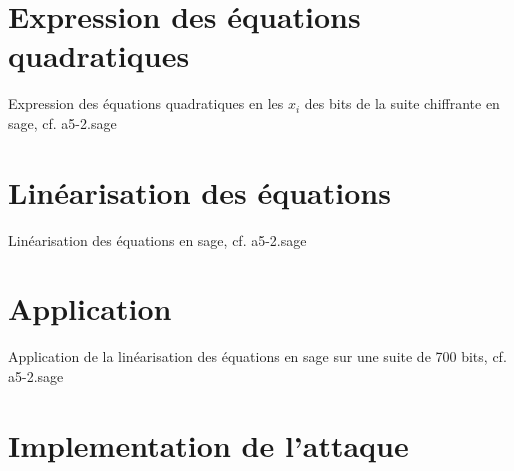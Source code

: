 \documentclass[a4paper]{article}
\begin{document}


\section{Expression des équations quadratiques}
Expression des équations quadratiques en les $x_i$ des bits de la suite chiffrante en sage, cf. a5-2.sage



\section{Linéarisation des équations}
Linéarisation des équations en sage, cf. a5-2.sage

\section{Application}
Application de la linéarisation des équations en sage sur une suite de 700 bits, cf. a5-2.sage









\section{Implementation de l'attaque}




\nocite{*}
\end{document}
